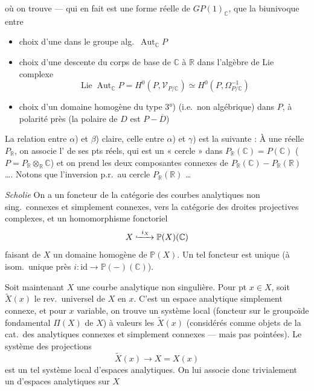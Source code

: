 \documentclass[11pt,a4paper]{article}
\begin{document}
où on trouve    — qui en fait est une forme réelle de $GP(1)_{\mathbb{C}}$, \struck{\ill{}}  \struck{\ill{}}  que la \struck{\ill{}}   biunivoque entre
\begin{itemize}
\item[$\alpha$)] choix d'une   dans le groupe alg.\ $\operatorname{Aut}_{\mathbb{C}} P$
\item[$\beta$)] choix d'une descente du corps de base de $\mathbb{C}$ à $\mathbb{R}$ dans l'algèbre de Lie complexe
\[
\operatorname{Lie}\operatorname{Aut}_{\mathbb{C}} P = H^{0}(P, \mathcal{V}_{P/\mathbb{C}}) \simeq H^{0}(P, \Omega^{-1}_{P/\mathbb{C}})
\]
\item[$\gamma$)] choix d'un domaine homogène du type 3°) (i.e.\ non algébrique) dans $P$, à polarité près (la polaire de $D$ est $P - \overline{D}$)
\end{itemize}

La relation entre $\alpha$) et $\beta$) claire, celle entre $\alpha$) et $\gamma$) est la suivante : À une \struck{\ill{}}  réelle $P_{\mathbb{R}}$, on associe l' de ses pts réels, qui est un « cercle » dans $P_{\mathbb{R}}(\mathbb{C}) = P(\mathbb{C})$ ($P = P_{\mathbb{R}} \otimes_{\mathbb{R}} \mathbb{C}$) et on prend les deux composantes connexes de $P_{\mathbb{R}}(\mathbb{C}) - P_{\mathbb{R}}(\mathbb{R})$ …. Notons que l'inversion p.r.\ au cercle $P_{\mathbb{R}}(\mathbb{R})$ …

\emph{Scholie} On a un foncteur  de la catégorie des courbes analytiques non sing.\ connexes et simplement connexes, vers la catégorie des droites projectives complexes, et un homomorphisme fonctoriel
\[
X \xhookrightarrow{\ i_X\ } \mathbb{P}(X)(\mathbb{C})
\]
faisant de $X$ un domaine homogène de $\mathbb{P}(X)$. Un tel foncteur est unique (à isom.\ unique près  $i : \mathrm{id} \to \mathbb{P}(-)(\mathbb{C})$).

Soit maintenant $X$ une courbe analytique non singulière. Pour  pt $x \in X$, soit $\widetilde{X}(x)$ le rev.\ universel de $X$ en $x$. C'est un espace analytique simplement connexe, et pour $x$ variable, on trouve un système local (foncteur sur le groupoïde fondamental $\Pi(X)$ de $X$) à valeurs les $\widetilde{X}(x)$ (considérés comme objets de la cat.\ des   analytiques connexes et simplement connexes — mais pas pointées). Le système des projections
\[
\widetilde{X}(x) \longrightarrow X = X(x)
\]
est un tel système local d'espaces analytiques. On lui associe donc trivialement un  d'espaces analytiques sur $X$
\end{document}
